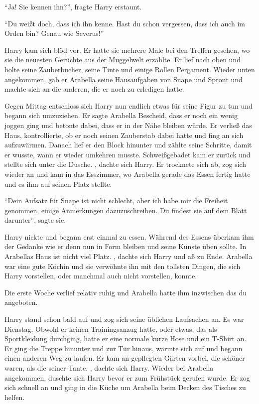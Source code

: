 \enquote{Ja! Sie kennen ihn?}, fragte Harry erstaunt.

\enquote{Du weißt doch, dass ich ihn kenne. Hast du schon vergessen, dass ich auch im Orden bin? Genau wie Severus!}

Harry kam sich blöd vor. Er hatte sie mehrere Male bei den Treffen gesehen, wo sie die neuesten Gerüchte aus der Muggelwelt erzählte. Er lief nach oben und holte seine Zauberbücher, seine Tinte und einige Rollen Pergament. Wieder unten angekommen, gab er Arabella seine Hausaufgaben von Snape und Sprout und machte sich an die anderen, die er noch zu erledigen hatte.

Gegen Mittag entschloss sich Harry nun endlich etwas für seine Figur zu tun und begann sich umzuziehen. Er sagte Arabella Bescheid, dass er noch ein wenig joggen ging und betonte dabei, dass er in der Nähe bleiben würde. Er verließ das Haus, kontrollierte, ob er noch seinen Zauberstab dabei hatte und fing an sich aufzuwärmen. Danach lief er den Block hinunter und zählte seine Schritte, damit er wusste, wann er wieder umkehren musste. Schweißgebadet kam er zurück und stellte sich unter die Dusche. , dachte sich Harry. Er trocknete sich ab, zog sich wieder an und kam in das Esszimmer, wo Arabella gerade das Essen fertig hatte und es ihm auf seinen Platz stellte.

\enquote{Dein Aufsatz für Snape ist nicht schlecht, aber ich habe mir die Freiheit genommen, einige Anmerkungen dazuzuschreiben. Du findest sie auf dem Blatt darunter}, sagte sie.

Harry nickte und begann erst einmal zu essen. Während des Essens überkam ihm der Gedanke wie er denn nun in Form bleiben und seine Künste üben sollte. In Arabellas Haus ist nicht viel Platz. , dachte sich Harry und aß zu Ende. Arabella war eine gute Köchin und sie verwöhnte ihn mit den tollsten Dingen, die sich Harry vorstellen, oder manchmal auch nicht vorstellen, konnte.

Die erste Woche verlief relativ ruhig und Arabella hatte ihm inzwischen das du angeboten.

Harry stand schon bald auf und zog sich seine üblichen Laufsachen an. Es war Dienstag. Obwohl er keinen Trainingsanzug hatte, oder etwas, das als Sportkleidung durchging, hatte er eine normale kurze Hose und ein T-Shirt an. Er ging die Treppe hinunter und zur Tür hinaus, wärmte sich auf und begann einen anderen Weg zu laufen. Er kam an gepflegten Gärten vorbei, die schöner waren, als die seiner Tante. , dachte sich Harry.  Wieder bei Arabella angekommen, duschte sich Harry bevor er zum Frühstück gerufen wurde. Er zog sich schnell an und ging in die Küche um Arabella beim Decken des Tisches zu helfen.

